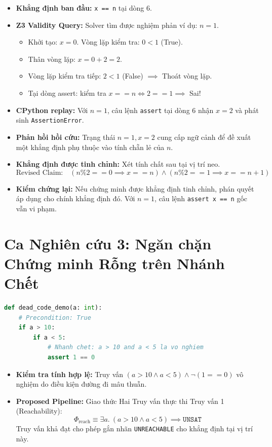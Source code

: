 \begin{itemize}
    \item \textbf{Khẳng định ban đầu:} \texttt{x == n} tại dòng 6.
    \item \textbf{Z3 Validity Query:} Solver tìm được nghiệm phản ví dụ: $n = 1$.
    \begin{itemize}
        \item Khởi tạo: $x = 0$. Vòng lặp kiểm tra: $0 < 1$ (True).
        \item Thân vòng lặp: $x = 0 + 2 = 2$.
        \item Vòng lặp kiểm tra tiếp: $2 < 1$ (False) $\implies$ Thoát vòng lặp.
        \item Tại dòng assert: kiểm tra $x == n \iff 2 == 1 \implies$ Sai!
    \end{itemize}
    \item \textbf{CPython replay:} Với $n = 1$, câu lệnh \texttt{assert} tại dòng 6 nhận $x = 2$ và phát sinh \texttt{AssertionError}.
    \item \textbf{Phản hồi hồi cứu:} Trạng thái $n = 1, x = 2$ cung cấp ngữ cảnh để đề xuất một khẳng định phụ thuộc vào tính chẵn lẻ của $n$.
    \item \textbf{Khẳng định được tinh chỉnh:} Xét tính chất sau tại vị trí neo.
    \begin{equation*}
    \text{Revised Claim:} \quad (n \% 2 == 0 \implies x == n) \land (n \% 2 == 1 \implies x == n + 1)
    \end{equation*}
    \item \textbf{Kiểm chứng lại:} Nếu chứng minh được khẳng định tinh chỉnh, phán quyết áp dụng cho chính khẳng định đó. Với $n = 1$, câu lệnh \texttt{assert x == n} gốc vẫn vi phạm.
\end{itemize}

\section{Ca Nghiên cứu 3: Ngăn chặn Chứng minh Rỗng trên Nhánh Chết}
\begin{lstlisting}[language=Python, caption={Mã nguồn chứa nhánh chết unfeasible\_branch}]
def dead_code_demo(a: int):
    # Precondition: True
    if a > 10:
        if a < 5:
            # Nhanh chet: a > 10 and a < 5 la vo nghiem
            assert 1 == 0
\end{lstlisting}

\begin{itemize}
    \item \textbf{Kiểm tra tính hợp lệ:} Truy vấn $(a > 10 \land a < 5) \land \neg (1 == 0)$ vô nghiệm do điều kiện đường đi mâu thuẫn.
    \item \textbf{Proposed Pipeline:} Giao thức Hai Truy vấn thực thi Truy vấn 1 (Reachability):
    \begin{equation*}
    \Phi_{\text{reach}} \equiv \exists a. \ (a > 10 \land a < 5) \implies \texttt{UNSAT}
    \end{equation*}
    Truy vấn khả đạt cho phép gắn nhãn \texttt{UNREACHABLE} cho khẳng định tại vị trí này.
\end{itemize}
